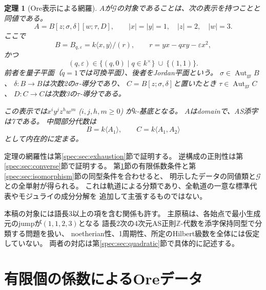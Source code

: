 \documentclass[11pt,a4paper]{ltjsarticle}
\newtheorem{theorem}{定理}[section]
\theoremstyle{definition}
\newcommand{\Aut}{\operatorname{Aut}}
\newcommand{\Gclass}{\mathcal G}
\newcommand{\ZZ}{\mathbb Z}
\begin{document}
\begin{theorem}[Ore表示による網羅]\label{spec:thm:ore-exhaustion}
$A$が$\Gclass$の対象であることは、次の表示を持つことと同値である。
\begin{equation}\label{spec:eq:iterated-ore}
A=B[z;\sigma,\delta][w;\tau,D],\qquad |x|=|y|=1,\quad |z|=2,\quad |w|=3.
\end{equation}
ここで
\begin{equation}\label{spec:eq:plane}
B=B_{q,\varepsilon}
=k\langle x,y\rangle/(r),\qquad r=yx-qxy-\varepsilon x^2,
\end{equation}
かつ
\[
(q,\varepsilon)\in
\{(q,0)\mid q\in k^\times\}\ \cup\ \{(1,1)\}.
\]
前者を量子平面（$q=1$では可換平面）、後者をJordan平面という。
$\sigma\in\Aut_{\mathrm{gr}}B$、
$\delta:B\to B$は次数2の$\sigma$-導分であり、
$C=B[z;\sigma,\delta]$と置いたとき
$\tau\in\Aut_{\mathrm{gr}}C$、
$D:C\to C$は次数3の$\tau$-導分である。

この表示では$x^iy^jz^hw^m$ ($i,j,h,m\geq0$) が$k$-基底となる。
$A$はdomainで、AS添字は7である。
中間部分代数は
\begin{equation}\label{spec:eq:canonical-flag}
B=k\langle A_1\rangle,\qquad C=k\langle A_1,A_2\rangle
\end{equation}
として内在的に定まる。
\end{theorem}

定理の網羅性は第\ref{spec:sec:exhaustion}節で証明する。
逆構成の正則性は第\ref{spec:sec:converse}節で証明する。
第\ref{spec:sec:data}節の有限係数条件と第\ref{spec:sec:isomorphism}節の同型条件を合わせると、
明示したデータの同値類と$\Gclass$との全単射が得られる。
これは軌道による分類であり、全軌道の一意な標準代表やモジュライの成分分解を
追加して主張するものではない。

本稿の対象には語長3以上の項を含む関係も許す。
主原稿は、各始点で最小生成元のjumpが$(1,1,2,3)$となる
語長2次の4次元AS正則$\ZZ$-代数を添字保持同型で分類する問題を扱い、
noetherian性、1周期性、所定のHilbert級数を全体には仮定していない。
両者の対応は第\ref{spec:sec:quadratic}節で具体的に記述する。

\section{有限個の係数によるOreデータ}\label{spec:sec:data}
\end{document}
